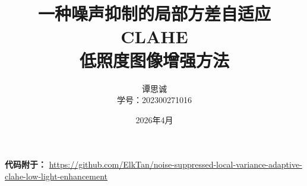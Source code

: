 \documentclass[12pt,a4paper]{ctexart}
\title{一种噪声抑制的局部方差自适应 CLAHE\\低照度图像增强方法}
\author{谭思诚\\学号：202300271016}
\date{2026年4月}
\begin{document}
\maketitle
\begin{center}
\noindent\textbf{代码附于：}
\href{https://github.com/ElkTan/noise-suppressed-local-variance-adaptive-clahe-low-light-enhancement}
{https://github.com/ElkTan/noise-suppressed-local-variance-adaptive-clahe-low-light-enhancement}
\end{center}










\end{document}
